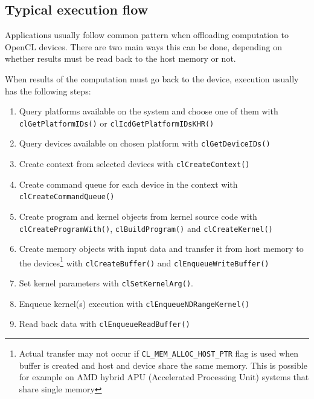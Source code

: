 \subsection{Typical execution flow}
Applications usually follow common pattern when offloading computation to OpenCL
devices. There are two main ways this can be done, depending on whether results
must be read back to the host memory or not.

When results of the computation must go back to the device, execution usually
has the following steps:

\begin{enumerate}
  \item Query platforms available on the system and choose one of them with
    \texttt{clGetPlatformIDs()} or \texttt{clIcd\-Get\-Platform\-IDsKHR()}
  \item Query devices available on chosen platform with \texttt{clGet\-DeviceIDs()}
  \item Create context from selected devices with \texttt{clCreate\-Context()}
  \item Create command queue for each device in the context with
    \texttt{clCreate\-Command\-Queue()}
  \item Create program and kernel objects from kernel source code with
    \texttt{clCreate\-Program\-With()}, \texttt{clBuild\-Program()} and
    \texttt{clCreate\-Kernel()}
  \item Create memory objects with input data and transfer it from host memory
    to the devices\footnote{Actual transfer may not occur if
      \texttt{CL\_MEM\_ALLOC\_HOST\_PTR} flag is used when buffer is created and
      host and device share the same memory. This is possible for example on
    AMD hybrid APU (Accelerated Processing Unit) systems that share single
    memory} with
    \texttt{clCreate\-Buffer()} and \texttt{clEnqueue\-Write\-Buffer()}
  \item Set kernel parameters with \texttt{clSet\-KernelArg()}.
  \item Enqueue kernel(s) execution with \texttt{clEnqueue\-NDRange\-Kernel()}
  \item Read back data with \texttt{clEnqueue\-Read\-Buffer()}
\end{enumerate}

